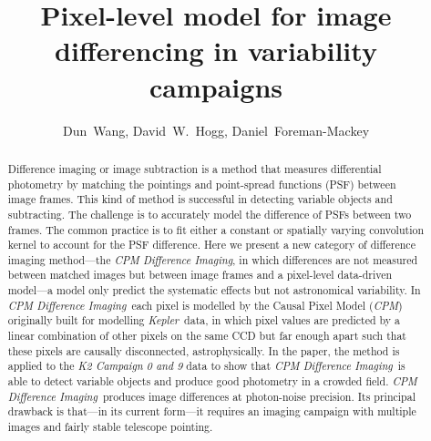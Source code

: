 \documentclass[12pt, preprint]{aastex}
\newcommand{\project}[1]{\textsl{#1}}
\newcommand{\cpm}{\project{CPM}}
\newcommand{\cpmdiff}{\project{CPM Difference Imaging}}
\newcommand{\kepler}{\project{Kepler}}
\begin{document}
\title{Pixel-level model for image differencing in variability campaigns}
\author{%
  Dun~Wang\altaffilmark{\ref{CCPP}},
  David~W.~Hogg\altaffilmark{\ref{CCPP},\ref{CDS},\ref{MPIA},\ref{email}},
  Daniel~Foreman-Mackey\altaffilmark{\ref{UW},\ref{SF}}
  }
\setcounter{address}{1}


\begin{abstract}
Difference imaging or image subtraction is a method that measures differential photometry by matching the pointings and point-spread functions (PSF) between image frames. 
This kind of method is successful in detecting variable objects and subtracting. The challenge is to accurately model the difference of PSFs between two frames. The common practice is to fit either a constant or spatially varying convolution kernel to account for the PSF difference.
Here we present a new category of difference imaging method---the \cpmdiff, in which differences are not measured between matched images but between image frames and a pixel-level data-driven model---a model only predict the systematic effects but not astronomical variability. 
In \cpmdiff\ each pixel is modelled by the Causal Pixel Model (\cpm) originally built for modelling \kepler\ data, in which pixel values are predicted by a linear combination of other pixels on the same CCD but far enough apart such that these pixels are causally disconnected, astrophysically. 
In the paper, the method is applied to the \project{K2 Campaign 0 and 9} data to show that \cpmdiff\ is able to detect variable objects and produce good photometry in a crowded field.
\cpmdiff\ produces image differences at photon-noise precision. 
Its principal drawback is that---in its current form---it requires an imaging campaign with multiple images and fairly stable telescope pointing.

\end{abstract}
\end{document}
